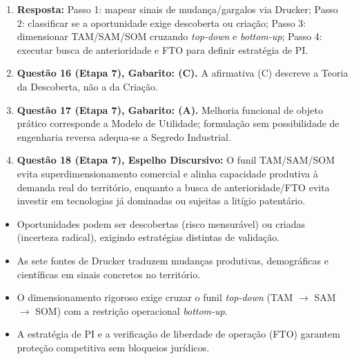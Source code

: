 \begin{boxGabarito}
\begin{enumerate}[leftmargin=1.5em, itemsep=4pt]
    \item \textbf{Resposta:} Passo 1: mapear sinais de mudança/gargalos via Drucker; Passo 2: classificar se a oportunidade exige descoberta ou criação; Passo 3: dimensionar TAM/SAM/SOM cruzando \textit{top-down} e \textit{bottom-up}; Passo 4: executar busca de anterioridade e FTO para definir estratégia de PI.
    \item \textbf{Questão 16 (Etapa 7), Gabarito: (C).} A afirmativa (C) descreve a Teoria da Descoberta, não a da Criação.
    \item \textbf{Questão 17 (Etapa 7), Gabarito: (A).} Melhoria funcional de objeto prático corresponde a Modelo de Utilidade; formulação sem possibilidade de engenharia reversa adequa-se a Segredo Industrial.
    \item \textbf{Questão 18 (Etapa 7), Espelho Discursivo:} O funil TAM/SAM/SOM evita superdimensionamento comercial e alinha capacidade produtiva à demanda real do território, enquanto a busca de anterioridade/FTO evita investir em tecnologias já dominadas ou sujeitas a litígio patentário.
  \end{enumerate}
\end{boxGabarito}

\begin{boxResumo}
  \begin{itemize}[leftmargin=1.4em, itemsep=2pt]
    \item Oportunidades podem ser descobertas (risco mensurável) ou criadas (incerteza radical), exigindo estratégias distintas de validação.
    \item As sete fontes de Drucker traduzem mudanças produtivas, demográficas e científicas em sinais concretos no território.
    \item O dimensionamento rigoroso exige cruzar o funil \textit{top-down} (TAM $\to$ SAM $\to$ SOM) com a restrição operacional \textit{bottom-up}.
    \item A estratégia de PI e a verificação de liberdade de operação (FTO) garantem proteção competitiva sem bloqueios jurídicos.
  \end{itemize}
\end{boxResumo}

